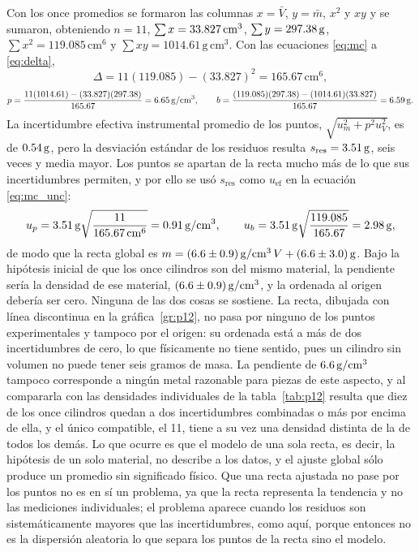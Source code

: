 Con los once promedios se formaron las columnas $x = \bar V$, $y = \bar m$, $x^{2}$ y $xy$ y se sumaron, obteniendo $n = 11$, $\sum x = 33.827\,\mathrm{cm^{3}}$, $\sum y = 297.38\,\mathrm{g}$, $\sum x^{2} = 119.085\,\mathrm{cm^{6}}$ y $\sum xy = 1014.61\,\mathrm{g\,cm^{3}}$. Con las ecuaciones \eqref{eq:mc} a \eqref{eq:delta},
\begin{equation*}
    \Delta = 11(119.085) - (33.827)^{2} = 165.67\,\mathrm{cm^{6}},
\end{equation*}
\begin{equation*}
    p = \frac{11(1014.61) - (33.827)(297.38)}{165.67} = 6.65\,\mathrm{g/cm^{3}}, \qquad
    b = \frac{(119.085)(297.38) - (1014.61)(33.827)}{165.67} = 6.59\,\mathrm{g}.
\end{equation*}
La incertidumbre efectiva instrumental promedio de los puntos, $\sqrt{u_m^{2} + p^{2}u_V^{2}}$, es de $0.54\,\mathrm{g}$, pero la desviación estándar de los residuos resulta $s_{\mathrm{res}} = 3.51\,\mathrm{g}$, seis veces y media mayor. Los puntos se apartan de la recta mucho más de lo que sus incertidumbres permiten, y por ello se usó $s_{\mathrm{res}}$ como $u_{\mathrm{ef}}$ en la ecuación \eqref{eq:mc_unc}:
\begin{equation*}
    u_p = 3.51\,\mathrm{g}\sqrt{\frac{11}{165.67\,\mathrm{cm^{6}}}} = 0.91\,\mathrm{g/cm^{3}}, \qquad
    u_b = 3.51\,\mathrm{g}\sqrt{\frac{119.085}{165.67}} = 2.98\,\mathrm{g},
\end{equation*}
de modo que la recta global es $m = (6.6 \pm 0.9)\,\mathrm{g/cm^{3}}\, V + (6.6 \pm 3.0)\,\mathrm{g}$. Bajo la hipótesis inicial de que los once cilindros son del mismo material, la pendiente sería la densidad de ese material, $(6.6 \pm 0.9)\,\mathrm{g/cm^{3}}$, y la ordenada al origen debería ser cero. Ninguna de las dos cosas se sostiene. La recta, dibujada con línea discontinua en la gráfica~\ref{gr:p12}, no pasa por ninguno de los puntos experimentales y tampoco por el origen: su ordenada está a más de dos incertidumbres de cero, lo que físicamente no tiene sentido, pues un cilindro sin volumen no puede tener seis gramos de masa. La pendiente de $6.6\,\mathrm{g/cm^{3}}$ tampoco corresponde a ningún metal razonable para piezas de este aspecto, y al compararla con las densidades individuales de la tabla~\ref{tab:p12} resulta que diez de los once cilindros quedan a dos incertidumbres combinadas o más por encima de ella, y el único compatible, el 11, tiene a su vez una densidad distinta de la de todos los demás. Lo que ocurre es que el modelo de una sola recta, es decir, la hipótesis de un solo material, no describe a los datos, y el ajuste global sólo produce un promedio sin significado físico. Que una recta ajustada no pase por los puntos no es en sí un problema, ya que la recta representa la tendencia y no las mediciones individuales; el problema aparece cuando los residuos son sistemáticamente mayores que las incertidumbres, como aquí, porque entonces no es la dispersión aleatoria lo que separa los puntos de la recta sino el modelo.

